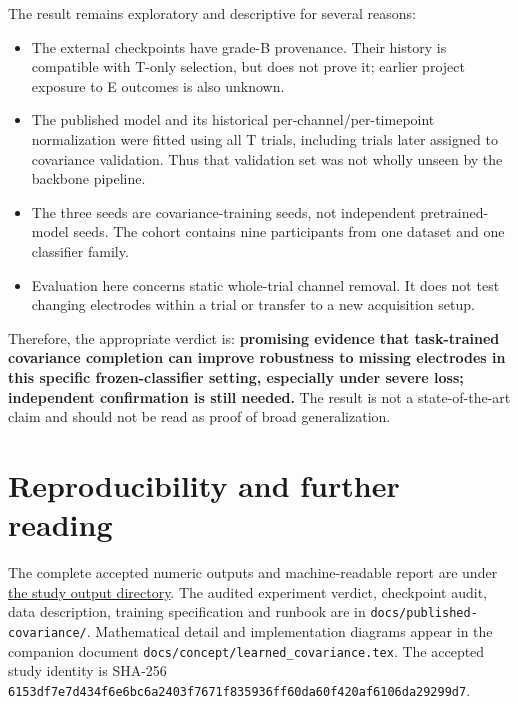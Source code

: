 \documentclass[11pt,a4paper]{article}
\begin{document}
The result remains exploratory and descriptive for several reasons:
\begin{itemize}
 \item The external checkpoints have grade-B provenance. Their history is compatible with T-only selection, but does not prove it; earlier project exposure to E outcomes is also unknown.
 \item The published model and its historical per-channel/per-timepoint normalization were fitted using all T trials, including trials later assigned to covariance validation. Thus that validation set was not wholly unseen by the backbone pipeline.
 \item The three seeds are covariance-training seeds, not independent pretrained-model seeds. The cohort contains nine participants from one dataset and one classifier family.
 \item Evaluation here concerns static whole-trial channel removal. It does not test changing electrodes within a trial or transfer to a new acquisition setup.
\end{itemize}
Therefore, the appropriate verdict is: \textbf{promising evidence that task-trained covariance completion can improve robustness to missing electrodes in this specific frozen-classifier setting, especially under severe loss; independent confirmation is still needed.} The result is not a state-of-the-art claim and should not be read as proof of broad generalization.

\section*{Reproducibility and further reading}
The complete accepted numeric outputs and machine-readable report are under \href{../../results/published-covariance-v1-cuda-root/report.md}{the study output directory}. The audited experiment verdict, checkpoint audit, data description, training specification and runbook are in \texttt{docs/published-covariance/}. Mathematical detail and implementation diagrams appear in the companion document \texttt{docs/concept/learned\_covariance.tex}. The accepted study identity is SHA-256 \texttt{6153df7e7d434f6e6bc6a2403f7671f835936ff60da60f420af6106da29299d7}.
\end{document}
